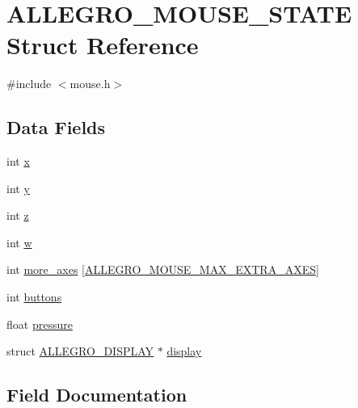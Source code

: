 \hypertarget{struct_a_l_l_e_g_r_o___m_o_u_s_e___s_t_a_t_e}{}\section{A\+L\+L\+E\+G\+R\+O\+\_\+\+M\+O\+U\+S\+E\+\_\+\+S\+T\+A\+TE Struct Reference}
\label{struct_a_l_l_e_g_r_o___m_o_u_s_e___s_t_a_t_e}


{\ttfamily \#include $<$mouse.\+h$>$}

\subsection*{Data Fields}
\begin{DoxyCompactItemize}
\item 
int \hyperlink{struct_a_l_l_e_g_r_o___m_o_u_s_e___s_t_a_t_e_a8689b8c2477124d36e8f27ba2b17ef7c}{x}
\item 
int \hyperlink{struct_a_l_l_e_g_r_o___m_o_u_s_e___s_t_a_t_e_a230fbdb482488155dba5d828f0036ea8}{y}
\item 
int \hyperlink{struct_a_l_l_e_g_r_o___m_o_u_s_e___s_t_a_t_e_a472256bc97d5af976df42eda84e739f4}{z}
\item 
int \hyperlink{struct_a_l_l_e_g_r_o___m_o_u_s_e___s_t_a_t_e_aaead134e7de3eeb2780f892f0bb1f790}{w}
\item 
int \hyperlink{struct_a_l_l_e_g_r_o___m_o_u_s_e___s_t_a_t_e_af2908a3fd161f1ac09c8f4be4cbd4c5a}{more\+\_\+axes} \mbox{[}\hyperlink{mouse_8h_ab3bce1b178217cf5568d318b056d5f51}{A\+L\+L\+E\+G\+R\+O\+\_\+\+M\+O\+U\+S\+E\+\_\+\+M\+A\+X\+\_\+\+E\+X\+T\+R\+A\+\_\+\+A\+X\+ES}\mbox{]}
\item 
int \hyperlink{struct_a_l_l_e_g_r_o___m_o_u_s_e___s_t_a_t_e_a1a8330d7b3ebe0f544bcae5cd86ef337}{buttons}
\item 
float \hyperlink{struct_a_l_l_e_g_r_o___m_o_u_s_e___s_t_a_t_e_a7e29584de8ed96b658ca38c4fb487931}{pressure}
\item 
struct \hyperlink{display_8h_a7516185aa39c086f4bc62bd4bf5858bf}{A\+L\+L\+E\+G\+R\+O\+\_\+\+D\+I\+S\+P\+L\+AY} $\ast$ \hyperlink{struct_a_l_l_e_g_r_o___m_o_u_s_e___s_t_a_t_e_a74a55881ac6c64b9c6a4b9b6c4727224}{display}
\end{DoxyCompactItemize}


\subsection{Field Documentation}
\mbox{\label{struct_a_l_l_e_g_r_o___m_o_u_s_e___s_t_a_t_e_a1a8330d7b3ebe0f544bcae5cd86ef337}} 
